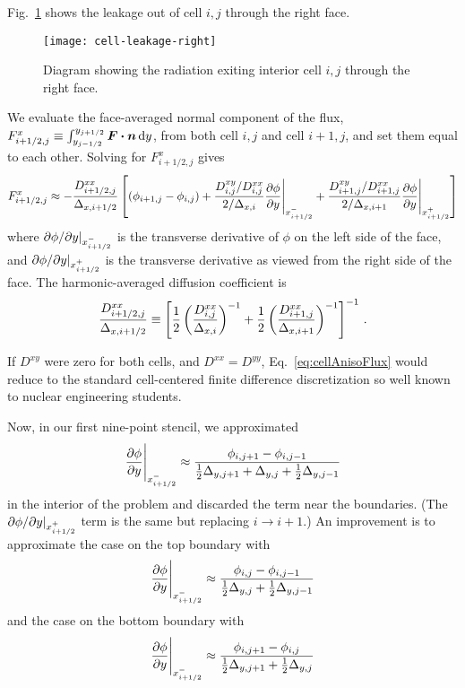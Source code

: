 Fig.~\ref{fig:cellAnisoLeakage} shows the leakage out of cell $i,j$ through the
right face.
\begin{figure}[htb]
  \centering
  \texttt{[image: cell-leakage-right]}
  \caption{Diagram showing the radiation exiting interior cell $i,j$ through the
  right face.}
  \label{fig:cellAnisoLeakage}
\end{figure}
We evaluate the face-averaged normal component of the flux,
$F_{i+1/2,j}^x \equiv \int_{y_{j-1/2}}^{y_{j+1/2}} \bm{F} \bm{\cdot} \bm{n} \mathop{}\!\mathrm{d}
y$, from both cell $i,j$ and cell $i+1,j$, and set them equal to each other.
Solving for $F_{i+1/2,j}^x$ gives
\begin{equation} \label{eq:cellAnisoFlux}
  F_{i+1/2,j}^{x} \approx
  - \frac{D^{xx}_{i+1/2,j}}{\Delta_{x,i+1/2}}
  \left[ 
    \left( \phi_{i+1,j} - \phi_{i,j} \right)
  + \frac{D^{xy}_{i,j}/D^{xx}_{i,j}}{2/\Delta_{x,i}}
    \frac{\partial \phi}{\partial y} \Bigg|_{x_{i+1/2}^-}
  + \frac{D^{xy}_{i+1,j}/D^{xx}_{i+1,j}}{2/\Delta_{x,i+1}}
    \frac{\partial \phi}{\partial y} \Bigg|_{x_{i+1/2}^+}
  \right]
\end{equation}
where ${\partial \phi}/{\partial y} |_{x_{i+1/2}^-}$ is the transverse derivative of
$\phi$ on the left side of the face, and ${\partial \phi}/{\partial y} |_{x_{i+1/2}^+}$ is
the transverse derivative as viewed from the right side of the face.
The harmonic-averaged diffusion coefficient is
\begin{equation} \label{eq:cellEdgeDHarmonic}
  \frac{D^{xx}_{i+1/2,j}}{\Delta_{x,i+1/2}} \equiv \left[
  \frac12 \left( \frac{D^{xx}_{i,j}}{\Delta_{x,i}} \right)^{-1}
 + \frac12 \left( \frac{D^{xx}_{i+1,j}}{\Delta_{x,i+1}} \right)^{-1}
  \right]^{-1}\,.
\end{equation}

If $D^{xy}$ were zero for both cells, and $D^{xx}=D^{yy}$,
Eq.~\eqref{eq:cellAnisoFlux} would reduce to
the standard cell-centered finite difference discretization so well known to
nuclear engineering students.

Now, in our first nine-point stencil, we approximated
\begin{equation*}
  \frac{\partial \phi}{\partial y} \Bigg|_{x_{i+1/2}^-} \approx \frac{\phi_{i,j+1} -
  \phi_{i,j-1}}{\tfrac12 \Delta_{y,j+1} + \Delta_{y,j} + \tfrac12
  \Delta_{y,j-1}}
\end{equation*}
in the interior of the problem and discarded the term near the boundaries. (The 
${\partial \phi}/{\partial y} |_{x_{i+1/2}^+}$ term is the same but replacing $i\to i+1$.)
An improvement is to approximate the case on the top boundary with
\begin{equation*}
  \frac{\partial \phi}{\partial y} \Bigg|_{x_{i+1/2}^-} \approx \frac{\phi_{i,j} -
  \phi_{i,j-1}}{\tfrac12 \Delta_{y,j} + \tfrac12 \Delta_{y,j-1} }
\end{equation*}
and the case on the bottom boundary with 
\begin{equation*}
  \frac{\partial \phi}{\partial y} \Bigg|_{x_{i+1/2}^-} \approx \frac{\phi_{i,j+1} -
  \phi_{i,j}}{\tfrac12 \Delta_{y,j+1} + \tfrac12 \Delta_{y,j} }
\end{equation*}

